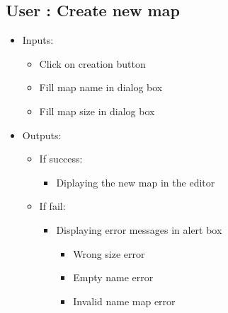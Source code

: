 \subsection{User : Create new map}
	\begin{itemize}
	
	
		\item Inputs:
			\begin{itemize}
				\item Click on creation button
				\item Fill map name in dialog box
				\item Fill map size in dialog box
			\end{itemize}
			\item Outputs:
				\begin{itemize}
					\item If success:					
					\begin{itemize}
						\item Diplaying the new map in the editor
					\end{itemize}
					\item If fail:
					\begin{itemize}
					\item Displaying error messages in alert box
					\begin{itemize}
						\item Wrong size error
						\item Empty name error
						\item Invalid name map error
					\end{itemize}
					\end{itemize}
				\end{itemize}
	\end{itemize}
	
